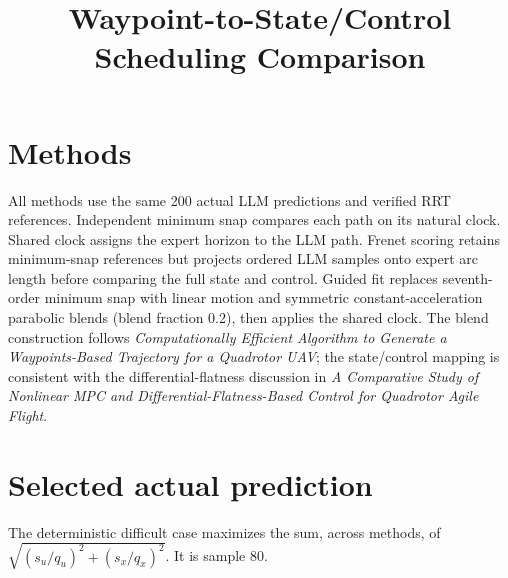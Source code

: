 \documentclass[11pt]{article}
\title{Waypoint-to-State/Control Scheduling Comparison}\author{}\date{}
\begin{document}
\maketitle
\section*{Methods}
All methods use the same 200 actual LLM predictions and verified RRT references. Independent minimum snap compares each path on its natural clock. Shared clock assigns the expert horizon to the LLM path. Frenet scoring retains minimum-snap references but projects ordered LLM samples onto expert arc length before comparing the full state and control. Guided fit replaces seventh-order minimum snap with linear motion and symmetric constant-acceleration parabolic blends (blend fraction 0.2), then applies the shared clock. The blend construction follows \emph{Computationally Efficient Algorithm to Generate a Waypoints-Based Trajectory for a Quadrotor UAV}; the state/control mapping is consistent with the differential-flatness discussion in \emph{A Comparative Study of Nonlinear MPC and Differential-Flatness-Based Control for Quadrotor Agile Flight}.
\section*{Selected actual prediction}
The deterministic difficult case maximizes the sum, across methods, of $\sqrt{(s_u/q_u)^2+(s_x/q_x)^2}$. It is sample 80.
\end{document}
